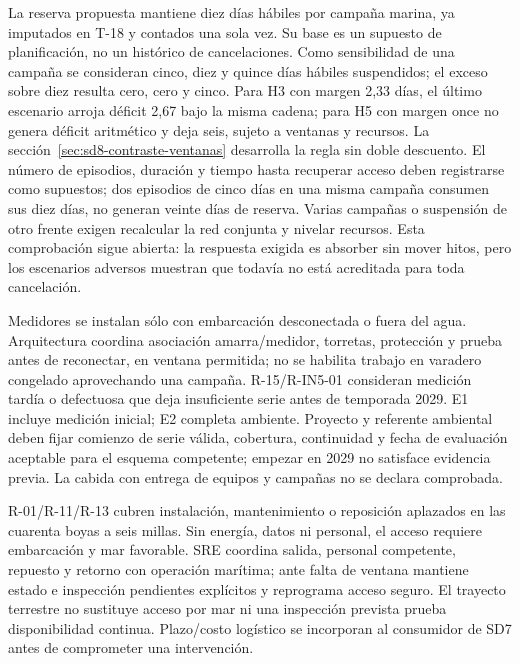 La reserva propuesta mantiene diez días hábiles por campaña marina, ya imputados en T-18 y contados una sola vez. Su base es un supuesto de planificación, no un histórico de cancelaciones. Como sensibilidad de una campaña se consideran cinco, diez y quince días hábiles suspendidos; el exceso sobre diez resulta cero, cero y cinco. Para H3 con margen 2,33 días, el último escenario arroja déficit 2,67 bajo la misma cadena; para H5 con margen once no genera déficit aritmético y deja seis, sujeto a ventanas y recursos. La sección~\ref{sec:sd8-contraste-ventanas} desarrolla la regla sin doble descuento. El número de episodios, duración y tiempo hasta recuperar acceso deben registrarse como supuestos; dos episodios de cinco días en una misma campaña consumen sus diez días, no generan veinte días de reserva. Varias campañas o suspensión de otro frente exigen recalcular la red conjunta y nivelar recursos. Esta comprobación sigue abierta: la respuesta exigida es absorber sin mover hitos, pero los escenarios adversos muestran que todavía no está acreditada para toda cancelación. \parencite[numeral 17.5; introducción y cap.~19]{sd8-c07}

Medidores se instalan sólo con embarcación desconectada o fuera del agua. Arquitectura coordina asociación amarra/medidor, torretas, protección y prueba antes de reconectar, en ventana permitida; no se habilita trabajo en varadero congelado aprovechando una campaña. R-15/R-IN5-01 consideran medición tardía o defectuosa que deja insuficiente serie antes de temporada 2029. E1 incluye medición inicial; E2 completa ambiente. Proyecto y referente ambiental deben fijar comienzo de serie válida, cobertura, continuidad y fecha de evaluación aceptable para el esquema competente; empezar en 2029 no satisface evidencia previa. La cabida con entrega de equipos y campañas no se declara comprobada. \parencite[numerales 13.1--13.2 y 17.3--17.5; Anexo B.2]{sd8-c07}

R-01/R-11/R-13 cubren instalación, mantenimiento o reposición aplazados en las cuarenta boyas a seis millas. Sin energía, datos ni personal, el acceso requiere embarcación y mar favorable. SRE coordina salida, personal competente, repuesto y retorno con operación marítima; ante falta de ventana mantiene estado e inspección pendientes explícitos y reprograma acceso seguro. El trayecto terrestre no sustituye acceso por mar ni una inspección prevista prueba disponibilidad continua. Plazo/costo logístico se incorporan al consumidor de SD7 antes de comprometer una intervención. \parencite[RT-21.16]{sd8-c07}


